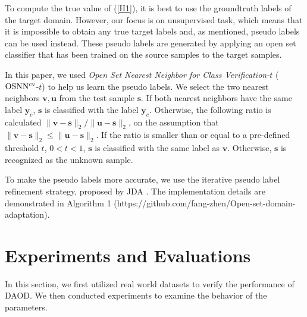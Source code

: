\documentclass[journal]{IEEEtran}
\begin{document}
To compute the true value of (\ref{H1}), it is best to use the groundtruth labels of the target domain.  However, our focus is on unsupervised task, which means that it is impossible to obtain any true target labels and, as mentioned, pseudo labels can be used instead. These pseudo labels are generated by applying an open set classifier that has been trained on the source samples to the target samples.
 
 In this paper, we used \textit{Open Set Nearest Neighbor for Class Verification-$t$} (${\rm OSNN^{cv}}$-$t$) \cite{DBLP:journals/ml/Mendes-JuniorSW17}  to help us learn the pseudo labels. We select the two nearest neighbors $\mathbf{v,u}$ from the test sample $\mathbf{s}$. 
If both nearest neighbors have the
same label $\mathbf{y}_c$, $\mathbf{s}$ is classified with the label $\mathbf{y}_c$. Otherwise, the following ratio is calculated
 $  \|\mathbf{v}-\mathbf{s}\|_{2}/\|\mathbf{u}-\mathbf{s}\|_{2}$,
on the assumption that $\|\mathbf{v}-\mathbf{s}\|_{2}\leq\|\mathbf{u}-\mathbf{s}\|_2$. If the ratio is smaller than or equal to a pre-defined threshold $t$, $0<t<1$, $\mathbf{s}$ is classified with the same label as $\mathbf{v}$. Otherwise, $\mathbf{s}$ is recognized as the unknown sample.
 
To make the pseudo labels more accurate, we use the iterative pseudo label refinement strategy, proposed by JDA \cite{long2013transfer}. The implementation details are demonstrated in Algorithm 1 (https://github.com/fang-zhen/Open-set-domain-adaptation).
 






 
  
 




\section{Experiments and Evaluations}
In this section, we first utilized real world datasets to verify
the performance of DAOD. We then conducted experiments to examine the behavior of the parameters. 
\end{document}
